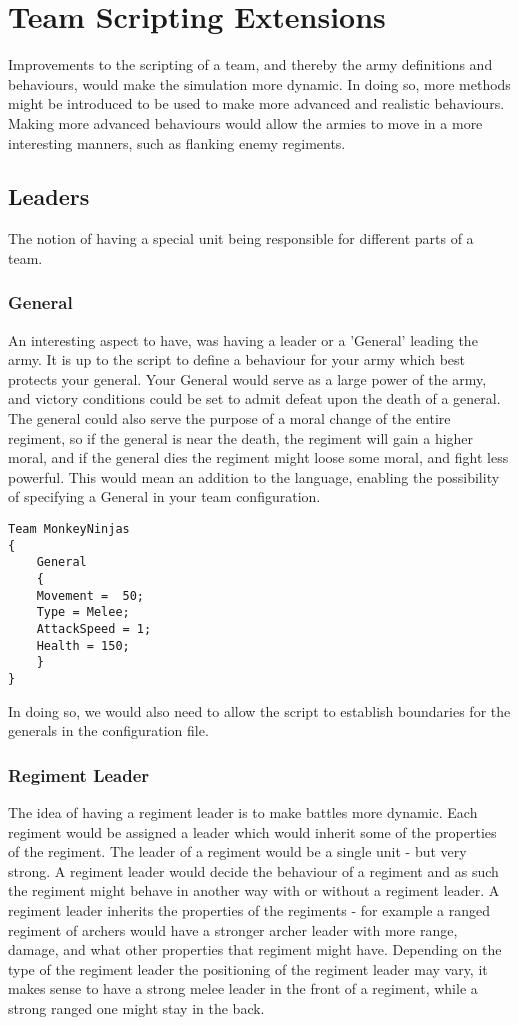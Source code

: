 \section{Team Scripting Extensions}
Improvements to the scripting of a team, and thereby the army definitions and behaviours, would make the simulation more dynamic. In doing so, more methods might be introduced to be used to make more advanced and realistic behaviours. Making more advanced behaviours would allow the armies to move in a more interesting manners, such as flanking enemy regiments.
\subsection{Leaders}
The notion of having a special unit being responsible for different parts of a team.
\subsubsection*{General}
An interesting aspect to have, was having a leader or a 'General' leading the army. It is up to the script to define a behaviour for your army which best protects your general. Your General would serve as a large power of the army, and victory conditions could be set to admit defeat upon the death of a general.\label{moral} The general could also serve the purpose of a moral change of the entire regiment, so if the general is near the death, the regiment will gain a higher moral, and if the general dies the regiment might loose some moral, and fight less powerful. This would mean an addition to the language, enabling the possibility of specifying a General in your team configuration.
\begin{lstlisting}
Team MonkeyNinjas
{
	General
	{
	Movement =  50;
	Type = Melee;
	AttackSpeed = 1;
	Health = 150;
	}
}

\end{lstlisting}
In doing so, we would also need to allow the script to establish boundaries for the generals in the configuration file.
\subsubsection*{Regiment Leader}
The idea of having a regiment leader is to make battles more dynamic. Each regiment would be assigned a leader which would inherit some of the properties of the regiment.
The leader of a regiment would be a single unit - but very strong. A regiment leader would decide the behaviour of a regiment and as such the regiment might behave in another way with or without a regiment leader. A regiment leader inherits the properties of the regiments - for example a ranged regiment of archers would have a stronger archer leader with more range, damage, and what other properties that regiment might have. Depending on the type of the regiment leader the positioning of the regiment leader may vary, it makes sense to have a strong melee leader in the front of a regiment, while a strong ranged one might stay in the back.

